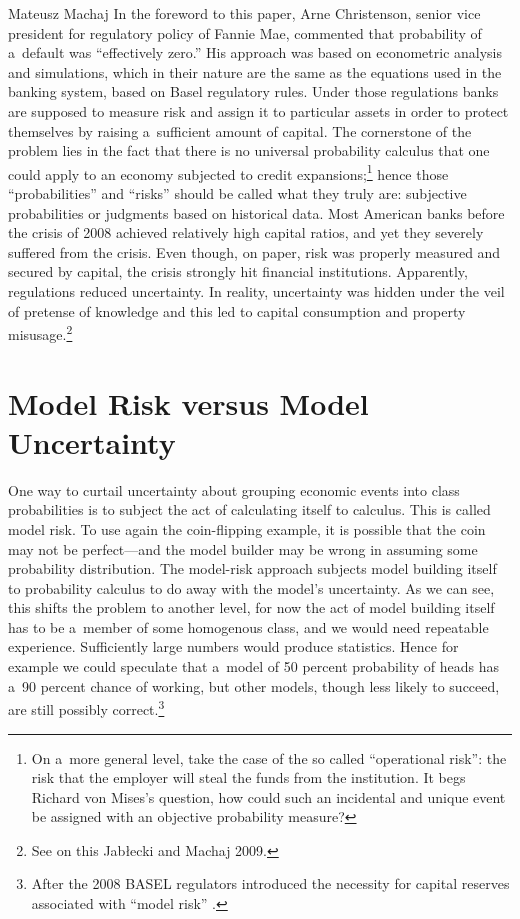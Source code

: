 \begin{artengenv}{Mateusz Machaj}
In the foreword to this paper, Arne Christenson, senior vice president for regulatory policy of Fannie Mae, commented that probability of a~default was ``effectively zero.'' His approach was based on econometric analysis and simulations, which in their nature are the same as the equations used in the banking system, based on Basel regulatory rules. Under those regulations banks are supposed to measure risk and assign it to particular assets in order to protect themselves by raising a~sufficient amount of capital. The cornerstone of the problem lies in the fact that there is no universal probability calculus that one could apply to an economy subjected to credit expansions;\footnote{On a~more general level, take the case of the so called ``operational risk'': the risk that the employer will steal the funds from the institution. It begs Richard von Mises's question, how could such an incidental and unique event be assigned with an objective probability measure?} hence those ``probabilities'' and ``risks'' should be called what they truly are: subjective probabilities or judgments based on historical data. Most American banks before the crisis of 2008 achieved relatively high capital ratios, and yet they severely suffered from the crisis. Even though, on paper, risk was properly measured and secured by capital, the crisis strongly hit financial institutions. Apparently, regulations reduced uncertainty. In reality, uncertainty was hidden under the veil of pretense of knowledge and this led to capital consumption and property misusage.\footnote{See on this Jabłecki and Machaj 2009.}



\section{Model Risk versus Model Uncertainty}

One way to curtail uncertainty about grouping economic events into class probabilities is to subject the act of calculating itself to calculus. This is called model risk. To use again the coin-flipping example, it is possible that the coin may not be perfect---and the model builder may be wrong in assuming some probability distribution. The model-risk approach subjects model building itself to probability calculus to do away with the model's uncertainty. As we can see, this shifts the problem to another level, for now the act of model building itself has to be a~member of some homogenous class, and we would need repeatable experience. Sufficiently large numbers would produce statistics. Hence for example we could speculate that a~model of 50 percent probability of heads has a~90 percent chance of working, but other models, though less likely to succeed, are still possibly correct.\footnote{After the 2008 BASEL regulators introduced the necessity for capital reserves associated with ``model risk'' 
\parencite[][p.1295]{alexander_quantile_2012}.%
}




\end{artengenv}

